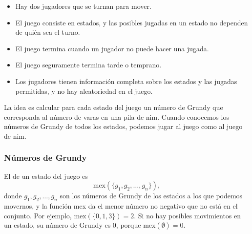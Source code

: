 \begin{itemize}[noitemsep]
\item Hay dos jugadores que se turnan para mover.
\item El juego consiste en estados, y las posibles jugadas
en un estado no dependen de quién sea el turno.
\item El juego termina cuando un jugador no puede hacer una jugada.
\item El juego seguramente termina tarde o temprano.
\item Los jugadores tienen información completa sobre
los estados y las jugadas permitidas, y no hay aleatoriedad en el juego.
\end{itemize}
La idea es calcular para cada estado del juego
un número de Grundy que corresponda al número de
varas en una pila de nim.
Cuando conocemos los números de Grundy de todos los estados,
podemos jugar al juego como al juego de nim.

\subsubsection{Números de Grundy}


El  de un estado del juego es
\[\textrm{mex}(\{g_1,g_2,\ldots,g_n\}),\]
donde $g_1,g_2,\ldots,g_n$ son los números de Grundy de los
estados a los que podemos movernos,
y la función mex da el menor
número no negativo que no está en el conjunto.
Por ejemplo, $\textrm{mex}(\{0,1,3\})=2$.
Si no hay posibles movimientos en un estado,
su número de Grundy es 0, porque
$\textrm{mex}(\emptyset)=0$.

